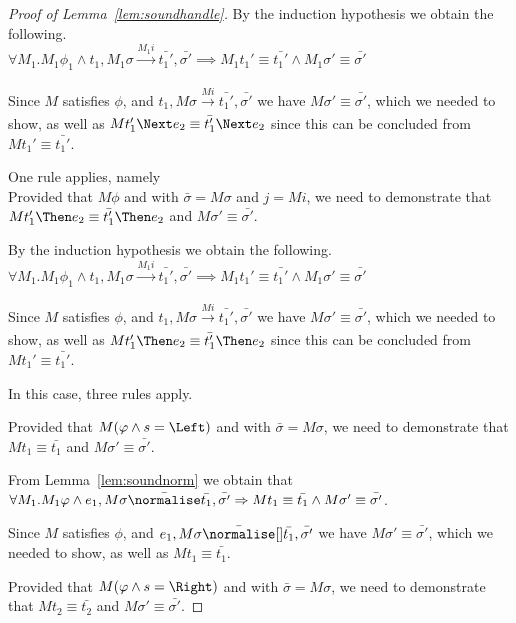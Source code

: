\begin{proof}[Proof of Lemma~\ref{lem:soundhandle}]
{{    By the induction hypothesis we obtain the following.\\
    $\forall M_1 . M_1 \phi_1 \land t_1,M_1\sigma \xrightarrow[]{M_1 i} \bar{t_1'},\bar{\sigma'}\implies M_1 t_1'\equiv\bar{t_1'}\land M_1\sigma' \equiv \bar{\sigma'}$

    Since $M$ satisfies $\phi$, and $t_1,M\sigma \xrightarrow[]{M i} \bar{t_1'},\bar{\sigma'}$ we have $M\sigma'\equiv\bar{\sigma'}$,
    which we needed to show, as well as $M t_1' \Next e_2 \equiv \bar{t_1'}\Next e_2$ since this can be concluded from $M t_1'\equiv \bar{t_1'}$.
    }
  }

  {One rule applies, namely \\
  Provided that $M\phi$ and  with $\bar{\sigma}=M\sigma$ and $j= M i$,
  we need to demonstrate that $M t_1'\Then e_2\equiv \bar{t_1'}\Then e_2$ and $M\sigma'\equiv\bar{\sigma'}$.

  By the induction hypothesis we obtain the following.\\
  $\forall M_1 . M_1 \phi_1 \land t_1,M_1\sigma \xrightarrow[]{M_1 i} \bar{t_1'},\bar{\sigma'}\implies M_1 t_1'\equiv\bar{t_1'}\land M_1\sigma' \equiv \bar{\sigma'}$

  Since $M$ satisfies $\phi$, and $t_1,M\sigma \xrightarrow[]{M i} \bar{t_1'},\bar{\sigma'}$ we have $M\sigma'\equiv\bar{\sigma'}$,
  which we needed to show, as well as $M t_1' \Then e_2 \equiv \bar{t_1'}\Then e_2$ since this can be concluded from $M t_1'\equiv \bar{t_1'}$.

  }

  {
  In this case, three rules apply.\\
    {
    }
    {Provided that $M(\phi\wedge s=\Left)$ and  with $\bar{\sigma}=M\sigma$,
    we need to demonstrate that $M t_1\equiv \bar{t_1}$ and $M\sigma'\equiv \bar{\sigma'}$.

    From Lemma~\ref{lem:soundnorm} we obtain that $\forall M_1. M_1 \phi \land e_1,M\sigma\bar{\normalise}\bar{t_1},\bar{\sigma'}\implies M t_1\equiv\bar{t_1}\land M \sigma'\equiv\bar{\sigma'}$.

    Since $M$ satisfies $\phi$, and $e_1,M\sigma \bar{\normalise}[] \bar{t_1},\bar{\sigma'}$ we have $M\sigma'\equiv\bar{\sigma'}$,
    which we needed to show, as well as $M t_1 \equiv \bar{t_1}$.

    }
    {Provided that $M(\phi\wedge s=\Right)$ and  with $\bar{\sigma}=M\sigma$,
    we need to demonstrate that $M t_2\equiv \bar{t_2}$ and $M\sigma'\equiv \bar{\sigma'}$.

}}
\end{proof}
